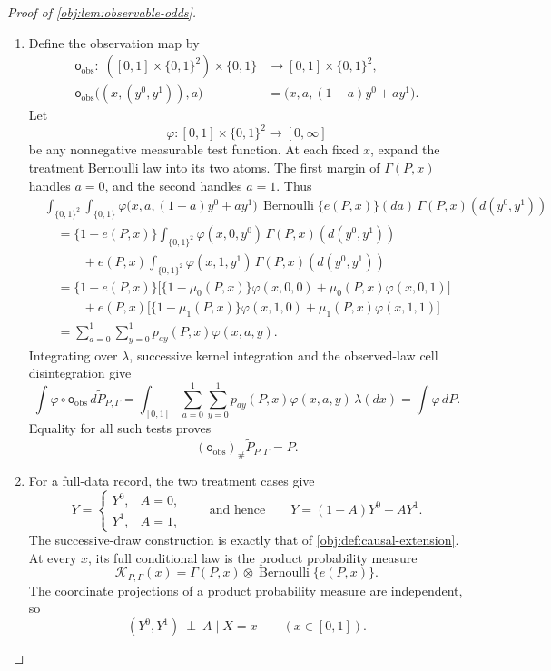 \documentclass[11pt]{article}
\begin{document}
\begin{proof}[Proof of \cref{obj:lem:observable-odds}]
\begin{enumerate}
\item Define the observation map by
\[
\begin{aligned}
\mathsf o_{\mathrm{obs}}:\;
([0,1]\times\{0,1\}^2)\times\{0,1\}
&\longrightarrow[0,1]\times\{0,1\}^2,\\
\mathsf o_{\mathrm{obs}}\bigl((x,(y^0,y^1)),a\bigr)
&=\bigl(x,a,(1-a)y^0+ay^1\bigr).
\end{aligned}
\]
Let
\[
\varphi:[0,1]\times\{0,1\}^2\longrightarrow[0,\infty]
\]
be any nonnegative measurable test function. At each fixed \(x\), expand the treatment Bernoulli law into its two atoms. The first margin of \(\Gamma(P,x)\) handles \(a=0\), and the second handles \(a=1\). Thus
\[
\begin{aligned}
&\int_{\{0,1\}^2}\int_{\{0,1\}}
 \varphi\bigl(x,a,(1-a)y^0+ay^1\bigr)\,
 \operatorname{Bernoulli}\{e(P,x)\}(da)\,
 \Gamma(P,x)(d(y^0,y^1))\\
&\quad=\{1-e(P,x)\}\int_{\{0,1\}^2}
 \varphi(x,0,y^0)\,\Gamma(P,x)(d(y^0,y^1))\\
&\qquad\quad
 +e(P,x)\int_{\{0,1\}^2}
 \varphi(x,1,y^1)\,\Gamma(P,x)(d(y^0,y^1))\\
&\quad=\{1-e(P,x)\}
 \bigl[\{1-\mu_0(P,x)\}\varphi(x,0,0)
       +\mu_0(P,x)\varphi(x,0,1)\bigr]\\
&\qquad\quad
 +e(P,x)
 \bigl[\{1-\mu_1(P,x)\}\varphi(x,1,0)
       +\mu_1(P,x)\varphi(x,1,1)\bigr]\\
&\quad=\sum_{a=0}^1\sum_{y=0}^1p_{ay}(P,x)\varphi(x,a,y).
\end{aligned}
\]
Integrating over \(\lambda\), successive kernel integration and the observed-law cell disintegration give
\[
\int\varphi\circ\mathsf o_{\mathrm{obs}}\,
 d\widetilde P_{P,\Gamma}
=
\int_{[0,1]}\sum_{a=0}^1\sum_{y=0}^1
 p_{ay}(P,x)\varphi(x,a,y)\,\lambda(dx)
=
\int\varphi\,dP.
\]
Equality for all such tests proves
\[
(\mathsf o_{\mathrm{obs}})_\#\widetilde P_{P,\Gamma}=P.
\]

\item For a full-data record, the two treatment cases give
\[
Y=
\begin{cases}
Y^0,&A=0,\\
Y^1,&A=1,
\end{cases}
\qquad\text{and hence}\qquad
Y=(1-A)Y^0+AY^1.
\]
The successive-draw construction is exactly that of \cref{obj:def:causal-extension}. At every \(x\), its full conditional law is the product probability measure
\[
\mathcal K_{P,\Gamma}(x)
=\Gamma(P,x)\otimes\operatorname{Bernoulli}\{e(P,x)\}.
\]
The coordinate projections of a product probability measure are independent, so
\[
(Y^0,Y^1)\ \perp\ A\mid X=x
\qquad(x\in[0,1]).
\]


\end{enumerate}
\end{proof}
\end{document}
